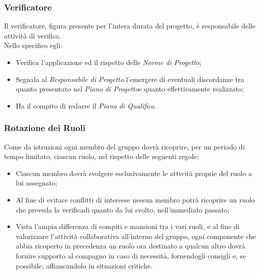 \subsubsection{Verificatore}
	Il verificatore, figura presente per l'intera durata del progetto\glossario, è responsabile delle attività di 				verifica\glossario.\\
	Nello specifico egli:
	\begin{itemize}
	\item Verifica l'applicazione ed il rispetto delle \textit{Norme di Progetto\glossario};
	\item Segnala al \textit{Responsabile di Progetto} l'emergere di eventuali discordanze tra quanto presentato nel 			\textit{Piano di Progetto}\glossario e quanto effettivamente realizzato;
	\item Ha il compito di redarre il \textit{Piano di Qualifica}.
	\end{itemize}

\subsubsection{Rotazione dei Ruoli}
	Come da istruzioni ogni membro del gruppo dovrà ricoprire, per un periodo di tempo limitato, ciascun ruolo, nel 			rispetto delle seguenti regole:
	\begin{itemize}
	\item Ciascun membro dovrà svolgere esclusivamente le attività proprie del ruolo a lui assegnato;
	\item Al fine di evitare conflitti di interesse nessun membro potrà ricoprire un ruolo che preveda la 									verifica\glossario di quanto da lui svolto, nell'immediato passato;
	\item Vista l'ampia differenza di compiti e mansioni tra i vari ruoli, e al fine di valorizzare l'attività 						collaborativa all'interno del gruppo, ogni componente che abbia ricoperto in precedenza un ruolo ora destinato 			a qualcun altro dovrà fornire supporto al compagno in caso di necessità, fornendogli consigli e, se possibile, 			affiancandolo in situazioni critiche.
	\end{itemize}
